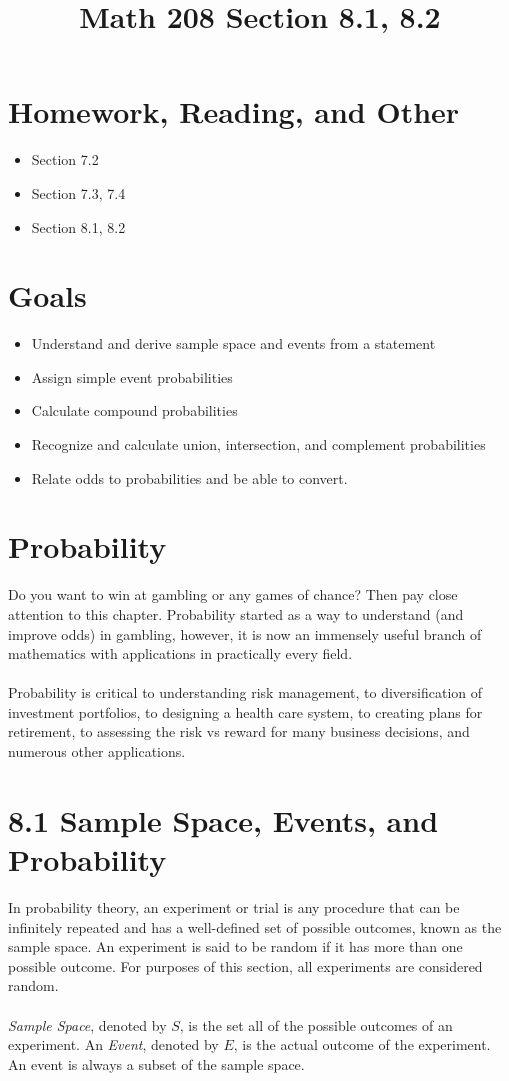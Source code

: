 \documentclass[14pt]{extarticle}
\title{\vspace{-5ex}Math 208 Section 8.1, 8.2}
\date{\vspace{-10ex}}
\begin{document}
\maketitle		
\section*{Homework, Reading, and Other}
\begin{itemize}
	\item Section 7.2
	\item Section 7.3, 7.4
	\item Section 8.1, 8.2
\end{itemize}

\section*{Goals}
\begin{itemize}
	\item Understand and derive sample space and events from a statement
	\item Assign simple event probabilities
	\item Calculate compound probabilities
	\item Recognize and calculate union, intersection, and complement probabilities
	\item Relate odds to probabilities and be able to convert.
\end{itemize}

\section*{Probability}
Do you want to win at gambling or any games of chance? Then pay close attention to this chapter. Probability started as a way to understand (and improve odds) in gambling, however, it is now an immensely useful branch of mathematics with applications in practically every field.
\\\\
Probability is critical to understanding risk management, to diversification of investment portfolios, to designing a health care system, to creating plans for retirement, to assessing the risk vs reward for many business decisions, and numerous other applications.

\section*{8.1 Sample Space, Events, and Probability}
In probability theory, an experiment or trial is any procedure that can be infinitely repeated and has a well-defined set of possible outcomes, known as the sample space. An experiment is said to be random if it has more than one possible outcome. For purposes of this section, all experiments are considered random.
\\\\
\textit{Sample Space}, denoted by $S$, is the set all of the possible outcomes of an experiment. An \textit{Event}, denoted by $E$, is the actual outcome of the experiment. An event is always a subset of the sample space.
\end{document}
